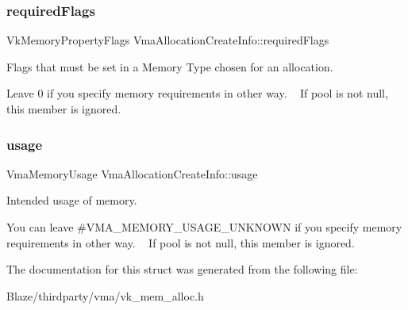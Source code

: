 \subsubsection{\texorpdfstring{required\+Flags}{requiredFlags}}
{\footnotesize\ttfamily Vk\+Memory\+Property\+Flags Vma\+Allocation\+Create\+Info\+::required\+Flags}



Flags that must be set in a Memory Type chosen for an allocation. 

Leave 0 if you specify memory requirements in other way. ~\newline
If {\ttfamily pool} is not null, this member is ignored. \mbox{\label{structVmaAllocationCreateInfo_accb8b06b1f677d858cb9af20705fa910}} 
\subsubsection{\texorpdfstring{usage}{usage}}
{\footnotesize\ttfamily Vma\+Memory\+Usage Vma\+Allocation\+Create\+Info\+::usage}



Intended usage of memory. 

You can leave \#\+V\+M\+A\+\_\+\+M\+E\+M\+O\+R\+Y\+\_\+\+U\+S\+A\+G\+E\+\_\+\+U\+N\+K\+N\+O\+WN if you specify memory requirements in other way. ~\newline
If {\ttfamily pool} is not null, this member is ignored. 

The documentation for this struct was generated from the following file\+:\begin{DoxyCompactItemize}
\item 
Blaze/thirdparty/vma/vk\+\_\+mem\+\_\+alloc.\+h\end{DoxyCompactItemize}
